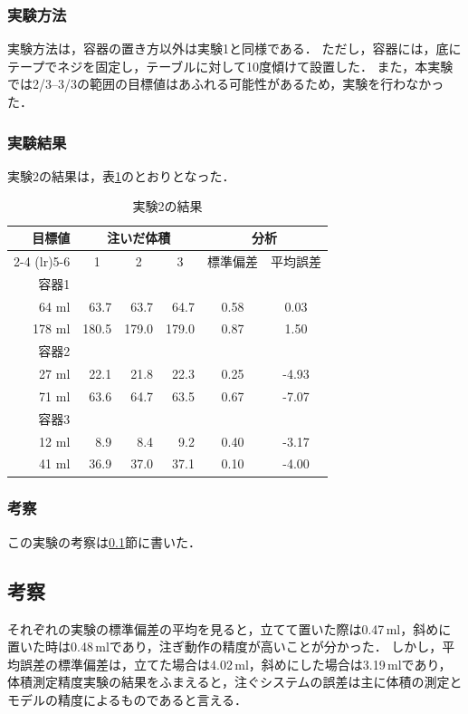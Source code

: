 		\subsubsection{実験方法}
		実験方法は，容器の置き方以外は実験1と同様である．
		ただし，容器には，底にテープでネジを固定し，テーブルに対して10度傾けて設置した．
		また，本実験では2/3--3/3の範囲の目標値はあふれる可能性があるため，実験を行わなかった．
		
		\subsubsection{実験結果}
		実験2の結果は，表\ref{Result2}のとおりとなった．
		\begin{table}[h]
			\centering
			\caption{実験2の結果}
			\label{Result2}
			\begin{tabular}{@{}r rrr cc@{}}
				\toprule
				目標値& \multicolumn{3}{c}{注いだ体積}& \multicolumn{2}{c}{分析}\\
				\cmidrule(lr){2-4} \cmidrule(lr){5-6}
				& \multicolumn{1}{c}{1} & \multicolumn{1}{c}{2} & \multicolumn{1}{c}{3}  & \multicolumn{1}{c}{標準偏差} & \multicolumn{1}{c}{平均誤差}\\
				\midrule
				容器1\\
				64 ml	&	63.7	&	63.7	&	64.7	&	0.58	&	0.03	\\
				178 ml	&	180.5	&	179.0	&	179.0	&	0.87	&	1.50	\\
				容器2\\
				27 ml	&	22.1	&	21.8	&	22.3	&	0.25	&	-4.93	\\
				71 ml	&	63.6	&	64.7	&	63.5	&	0.67	&	-7.07	\\
				容器3\\
				12 ml	&	8.9		&	8.4		&	9.2		&	0.40	&	-3.17	\\
				41 ml	&	36.9	&	37.0	&	37.1	&	0.10	&	-4.00	\\
				\bottomrule
			\end{tabular}
		\end{table}
	
		\subsubsection{考察}
		この実験の考察は\ref{sec:Method1Exp-conclusion}節に書いた．
		
	\subsection{考察}\label{sec:Method1Exp-conclusion}
	それぞれの実験の標準偏差の平均を見ると，立てて置いた際は0.47\,ml，斜めに置いた時は0.48\,mlであり，注ぎ動作の精度が高いことが分かった．
	しかし，平均誤差の標準偏差は，立てた場合は4.02\,ml，斜めにした場合は3.19\,mlであり，体積測定精度実験の結果をふまえると，注ぐシステムの誤差は主に体積の測定とモデルの精度によるものであると言える．
	
